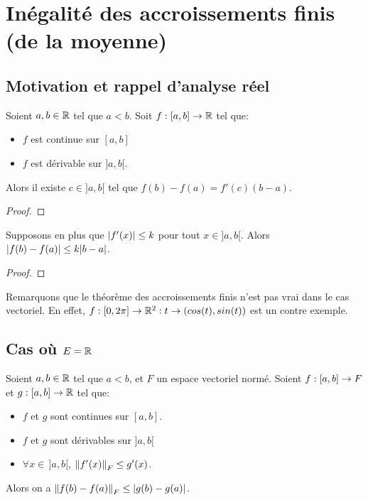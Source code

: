 \chapter{Inégalité des accroissements finis (de la moyenne)}

\section*{Motivation et rappel d'analyse réel}

\begin{theorem} 
	\label{theorem:mean_value_theorem_real_rappel}
	Soient $a, b \in \mathbb{R}$ tel que $a < b$.
	Soit $f : [a, b] \rightarrow \mathbb{R}$ tel que:

	\begin{itemize}
		\item $f$ est continue sur $[a, b]$
		\item $f$ est dérivable sur $]a, b[$.
	\end{itemize}

	Alors il existe $c \in ]a, b[$ tel que $f(b) - f(a) = f'(c) (b - a)$.
\end{theorem}

\ifdefined\outputproof
\begin{proof}

\end{proof}
\fi

\begin{proposition}
	Supposons en plus que $\abs{f'(x)} \leq k$ pour tout $x \in ]a, b[$.
	Alors $\abs{f(b) - f(a)} \leq k \abs{b - a}$.
\end{proposition}

\ifdefined\outputproof
\begin{proof}

\end{proof}
\fi

Remarquons que le théorème des accroissements finis n'est pas vrai dans le cas
vectoriel. En effet, $f : [0, 2\pi] \rightarrow \mathbb{R}^{2} : t \rightarrow
(cos(t), sin(t))$ est un contre exemple.

\section{Cas où $E = \mathbb{R}$}

\begin{theorem}
	Soient $a, b \in \mathbb{R}$ tel que $a < b$, et $F$ un espace vectoriel normé.
	Soient $f : [a, b] \rightarrow F$ et $g : [a, b] \rightarrow \mathbb{R}$ tel
	que:

	\begin{itemize}
		\item $f$ et $g$ sont continues sur $[a, b]$.
		\item $f$ et $g$ sont dérivables sur $]a, b[$
		\item $\forall x \in \, ]a, b[$, $\norm{f'(x)}_{F} \leq g'(x)$.
	\end{itemize}

	Alors on a $\norm{f(b) - f(a)}_{F} \leq \abs{g(b) - g(a)}$.
\end{theorem}

